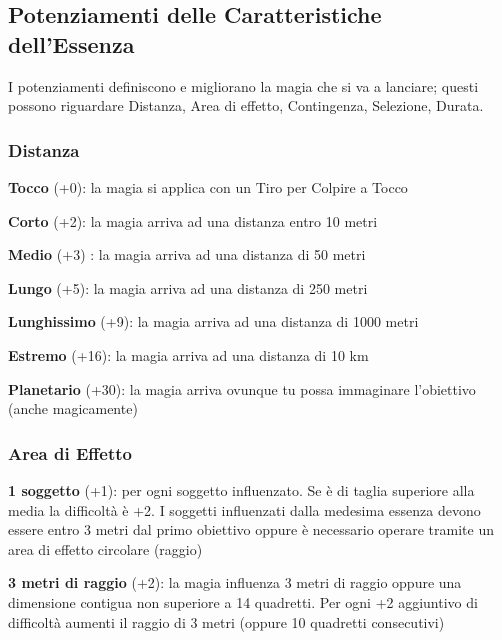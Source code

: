 \documentclass[a4paper,11pt,twoside,openany]{book}
\begin{document}
\subsection{Potenziamenti delle Caratteristiche dell'Essenza}

\label{potenziamenti-delle-caratteristiche-dellessenza}

I potenziamenti definiscono e migliorano la magia che si va a lanciare; questi possono riguardare Distanza, Area di effetto, Contingenza, Selezione, Durata.

\subsubsection{Distanza}

\label{distanza}

\textbf{Tocco} (+0): la magia si applica con un Tiro per Colpire a
Tocco

\textbf{Corto} (+2): la magia arriva ad una distanza entro 10 metri

\textbf{Medio} (+3) : la magia arriva ad una distanza di 50 metri

\textbf{Lungo} (+5): la magia arriva ad una distanza di 250 metri

\textbf{Lunghissimo} (+9): la magia arriva ad una distanza di 1000 metri

\textbf{Estremo} (+16): la magia arriva ad una distanza di 10 km

\textbf{Planetario} (+30): la magia arriva ovunque tu possa immaginare l'obiettivo (anche magicamente)

\subsubsection{Area di Effetto}

\label{area-di-effetto}

\textbf{1 soggetto} (+1): per ogni soggetto influenzato. Se è di taglia superiore alla media la difficoltà è +2. I soggetti influenzati dalla medesima essenza devono essere entro 3 metri dal primo obiettivo oppure è necessario operare tramite un area di effetto circolare (raggio)

\textbf{3 metri di raggio} (+2): la magia influenza 3 metri di raggio oppure una dimensione contigua non superiore a 14 quadretti. Per ogni +2 aggiuntivo di difficoltà aumenti il raggio di 3 metri (oppure 10 quadretti consecutivi)
\end{document}
